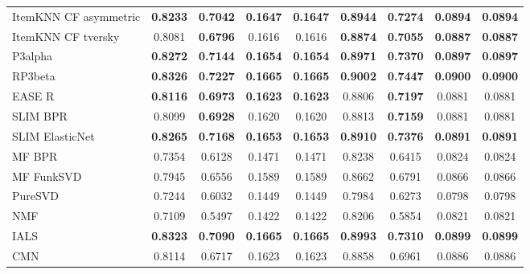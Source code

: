\documentclass{article}
\begin{document}
\begin{table}[htbp]
{\begin{tabular}{l|cccc|cccc|}
ItemKNN CF asymmetric &  \textbf{0.8233} &  \textbf{0.7042} &  \textbf{0.1647} &  \textbf{0.1647} &  \textbf{0.8944} &  \textbf{0.7274} &  \textbf{0.0894} &  \textbf{0.0894} \\
ItemKNN CF tversky    &           0.8081 &  \textbf{0.6796} &           0.1616 &           0.1616 &  \textbf{0.8874} &  \textbf{0.7055} &  \textbf{0.0887} &  \textbf{0.0887} \\
P3alpha               &  \textbf{0.8272} &  \textbf{0.7144} &  \textbf{0.1654} &  \textbf{0.1654} &  \textbf{0.8971} &  \textbf{0.7370} &  \textbf{0.0897} &  \textbf{0.0897} \\
RP3beta               &  \textbf{0.8326} &  \textbf{0.7227} &  \textbf{0.1665} &  \textbf{0.1665} &  \textbf{0.9002} &  \textbf{0.7447} &  \textbf{0.0900} &  \textbf{0.0900} \\
\midrule
EASE R                &  \textbf{0.8116} &  \textbf{0.6973} &  \textbf{0.1623} &  \textbf{0.1623} &           0.8806 &  \textbf{0.7197} &           0.0881 &           0.0881 \\
SLIM BPR              &           0.8099 &  \textbf{0.6928} &           0.1620 &           0.1620 &           0.8813 &  \textbf{0.7159} &           0.0881 &           0.0881 \\
SLIM ElasticNet       &  \textbf{0.8265} &  \textbf{0.7168} &  \textbf{0.1653} &  \textbf{0.1653} &  \textbf{0.8910} &  \textbf{0.7376} &  \textbf{0.0891} &  \textbf{0.0891} \\
MF BPR                &           0.7354 &           0.6128 &           0.1471 &           0.1471 &           0.8238 &           0.6415 &           0.0824 &           0.0824 \\
MF FunkSVD            &           0.7945 &           0.6556 &           0.1589 &           0.1589 &           0.8662 &           0.6791 &           0.0866 &           0.0866 \\
PureSVD               &           0.7244 &           0.6032 &           0.1449 &           0.1449 &           0.7984 &           0.6273 &           0.0798 &           0.0798 \\
NMF                   &           0.7109 &           0.5497 &           0.1422 &           0.1422 &           0.8206 &           0.5854 &           0.0821 &           0.0821 \\
IALS                  &  \textbf{0.8323} &  \textbf{0.7090} &  \textbf{0.1665} &  \textbf{0.1665} &  \textbf{0.8993} &  \textbf{0.7310} &  \textbf{0.0899} &  \textbf{0.0899} \\
\midrule
CMN                   &           0.8114 &           0.6717 &           0.1623 &           0.1623 &           0.8858 &           0.6961 &           0.0886 &           0.0886 \\
\bottomrule
\end{tabular}
}

\label{tab:my_label}
\end{table}
\end{document}
